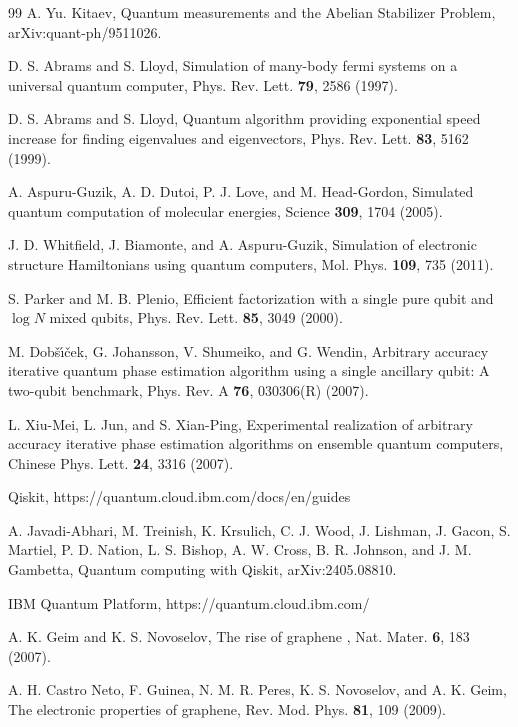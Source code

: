 \documentclass[twocolumn,superscriptaddress,amsmath,amssymb,showpacs,floatfix,preprintnumbers]{revtex4-1}
\begin{document}
\begin{thebibliography}{99}
A. Yu. Kitaev, 
Quantum measurements and the Abelian Stabilizer Problem,
arXiv:quant-ph/9511026.

D. S. Abrams and S. Lloyd, 
Simulation of many-body fermi systems on a universal quantum computer,
Phys. Rev. Lett. \textbf{79}, 2586 (1997).

D. S. Abrams and S. Lloyd, 
Quantum algorithm providing exponential speed increase for finding eigenvalues and eigenvectors,
Phys. Rev. Lett. \textbf{83}, 5162 (1999).

A. Aspuru-Guzik, A. D. Dutoi, P. J. Love, and M. Head-Gordon, 
Simulated quantum computation of molecular energies,
Science \textbf{309}, 1704 (2005).

J. D. Whitfield, J. Biamonte, and A. Aspuru-Guzik, 
Simulation of electronic structure Hamiltonians using quantum computers,
Mol. Phys. \textbf{109}, 735 (2011).

S. Parker and M. B. Plenio,
Efficient factorization with a single pure qubit and $\log N$ mixed qubits,
Phys. Rev. Lett. \textbf{85}, 3049 (2000).

M. Dob\v{s}\'{\i}\v{c}ek, G. Johansson, V. Shumeiko, and G. Wendin,
Arbitrary accuracy iterative quantum phase estimation algorithm using a single ancillary qubit: A two-qubit benchmark,
Phys. Rev. A \textbf{76}, 030306(R) (2007).

L. Xiu-Mei, L. Jun, and S. Xian-Ping, 
Experimental realization of arbitrary accuracy iterative phase estimation algorithms on ensemble quantum computers,
Chinese Phys. Lett. \textbf{24}, 3316 (2007).

Qiskit, https://quantum.cloud.ibm.com/docs/en/guides

A. Javadi-Abhari, M. Treinish, K. Krsulich, C. J. Wood, J. Lishman, J. Gacon, S. Martiel, 
P. D. Nation, L. S. Bishop, A. W. Cross, B. R. Johnson, and J. M. Gambetta, 
Quantum computing with Qiskit, arXiv:2405.08810.

IBM Quantum Platform, https://quantum.cloud.ibm.com/



A. K. Geim and K. S. Novoselov,
The rise of graphene ,
Nat. Mater. \textbf{6}, 183 (2007).

A. H. Castro Neto, F. Guinea, N. M. R. Peres, K. S. Novoselov, and A. K. Geim, 
The electronic properties of graphene,
Rev. Mod. Phys. \textbf{81}, 109 (2009).


\end{thebibliography}
\end{document}
